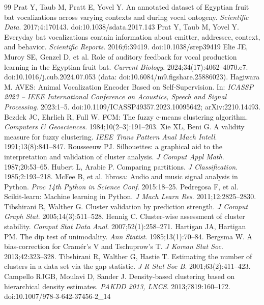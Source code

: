 \begin{thebibliography}{99}\small
{} Prat Y, Taub M, Pratt E, Yovel Y. An annotated dataset of Egyptian fruit bat vocalizations across varying contexts and during vocal ontogeny. \emph{Scientific Data}. 2017;4:170143. doi:10.1038/sdata.2017.143
 Prat Y, Taub M, Yovel Y. Everyday bat vocalizations contain information about emitter, addressee, context, and behavior. \emph{Scientific Reports}. 2016;6:39419. doi:10.1038/srep39419
 Elie JE, Muroy SE, Genzel D, et al. Role of auditory feedback for vocal production learning in the Egyptian fruit bat. \emph{Current Biology}. 2024;34(17):4062--4070.e7. doi:10.1016/j.cub.2024.07.053 (data: doi:10.6084/m9.figshare.25886023).
 Hagiwara M. AVES: Animal Vocalization Encoder Based on Self-Supervision. In: \emph{ICASSP 2023 -- IEEE International Conference on Acoustics, Speech and Signal Processing}. 2023:1--5. doi:10.1109/ICASSP49357.2023.10095642; arXiv:2210.14493.
 Bezdek JC, Ehrlich R, Full W. FCM: The fuzzy c-means clustering algorithm. \emph{Computers \& Geosciences}. 1984;10(2--3):191--203.
 Xie XL, Beni G. A validity measure for fuzzy clustering. \emph{IEEE Trans Pattern Anal Mach Intell}. 1991;13(8):841--847.
 Rousseeuw PJ. Silhouettes: a graphical aid to the interpretation and validation of cluster analysis. \emph{J Comput Appl Math}. 1987;20:53--65.
 Hubert L, Arabie P. Comparing partitions. \emph{J Classification}. 1985;2:193--218.
 McFee B, et al. librosa: Audio and music signal analysis in Python. \emph{Proc 14th Python in Science Conf}. 2015:18--25.
 Pedregosa F, et al. Scikit-learn: Machine learning in Python. \emph{J Mach Learn Res}. 2011;12:2825--2830.
 Tibshirani R, Walther G. Cluster validation by prediction strength. \emph{J Comput Graph Stat}. 2005;14(3):511--528.
 Hennig C. Cluster-wise assessment of cluster stability. \emph{Comput Stat Data Anal}. 2007;52(1):258--271.
 Hartigan JA, Hartigan PM. The dip test of unimodality. \emph{Ann Statist}. 1985;13(1):70--84.
 Bergsma W. A bias-correction for Cram\'er's V and Tschuprow's T. \emph{J Korean Stat Soc}. 2013;42:323--328.
 Tibshirani R, Walther G, Hastie T. Estimating the number of clusters in a data set via the gap statistic. \emph{J R Stat Soc B}. 2001;63(2):411--423.
 Campello RJGB, Moulavi D, Sander J. Density-based clustering based on hierarchical density estimates. \emph{PAKDD 2013, LNCS}. 2013;7819:160--172. doi:10.1007/978-3-642-37456-2\_14

\end{thebibliography}
